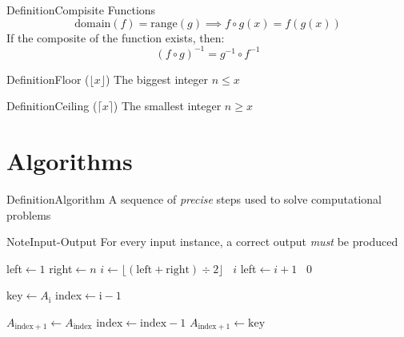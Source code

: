 \documentclass{MathNotes}
\newenvironment{definition}[1]{\begin{RedBox}{Definition}{#1}}{\end{RedBox}}
\newenvironment{note}[1]{\begin{YellowBox}{Note}{#1}}{\end{YellowBox}}
\begin{document}
\begin{definition}{Compisite Functions}\label{def:composite-function}
	\[\text{domain}(f)=\text{range}(g)\implies f\circ g(x)=f(g(x))\]
	If the composite of the function exists, then:
	\[(f\circ g)^{-1}=g^{-1}\circ f^{-1}\]
\end{definition}

\begin{multicols}{2}
\begin{definition}{Floor ($\lfloor x\rfloor$)}\label{def:floor-function}
	The biggest integer $n\leq x$
\end{definition}
\begin{definition}{Ceiling ($\lceil x\rceil$)}\label{def:floor-function}
	The smallest integer $n\geq x$
\end{definition}
\end{multicols}
\section{Algorithms}
\begin{multicols}{2}
\begin{definition}{Algorithm}\label{def:algorithm}
	A sequence of \textit{precise} steps used to solve computational problems
\end{definition}
\begin{note}{Input-Output}\label{note:input-output}
	For every input instance, a correct output \textit{must} be produced
\end{note}
\end{multicols}

\begin{algorithm}
\caption{Binary Search Algorithm}\label{alg:binary-search}


left$\gets 1$\;
right$\gets n$\;
{
	$i\gets\lfloor(\text{left}+\text{right})\div 2\rfloor$\;
	{
		\KwRet~$i$\;
	}
	{
		left$\gets i+1$\;
	}
}
\KwRet~$0$\;
\end{algorithm}

\begin{algorithm}
\caption{Insertion Sort}\label{alg:insertion-sort}

{
	key$\gets A_{\text{i}}$\;
	index$\gets\text{i}-1$\;

	{
		$A_{\text{index}+1}\gets A_{\text{index}}$\;
		$\text{index}\gets\text{index}-1$\;
	}
	$A_{\text{index}+1}\gets\text{key}$\;
}

\end{algorithm}
\end{document}

